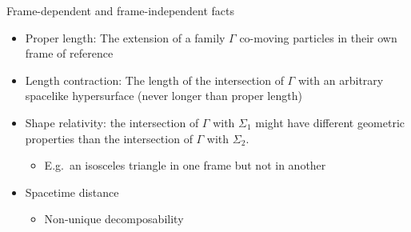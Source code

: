 \documentclass[fleqn]{beamer}
\begin{document}
\begin{frame}

 \begin{center}
\end{center}  


\end{frame}

\begin{frame}{Frame-dependent and frame-independent facts}

  \begin{itemize}
  \item Proper length: The extension of a family $\Gamma$ co-moving
    particles in their own frame of reference
  \item Length contraction: The length of the intersection of $\Gamma$
    with an arbitrary spacelike hypersurface (never longer than proper
    length)
  \item Shape relativity: the intersection of $\Gamma$ with
    $\Sigma _1$ might have different geometric properties than the
    intersection of $\Gamma$ with $\Sigma _2$.
    \begin{itemize}
    \item E.g.\ an isosceles triangle in one frame but not in another
    \end{itemize}
  \item Spacetime distance
    \begin{itemize}
    \item Non-unique decomposability
    \end{itemize}
  \end{itemize}
  
\end{frame}
\end{document}
